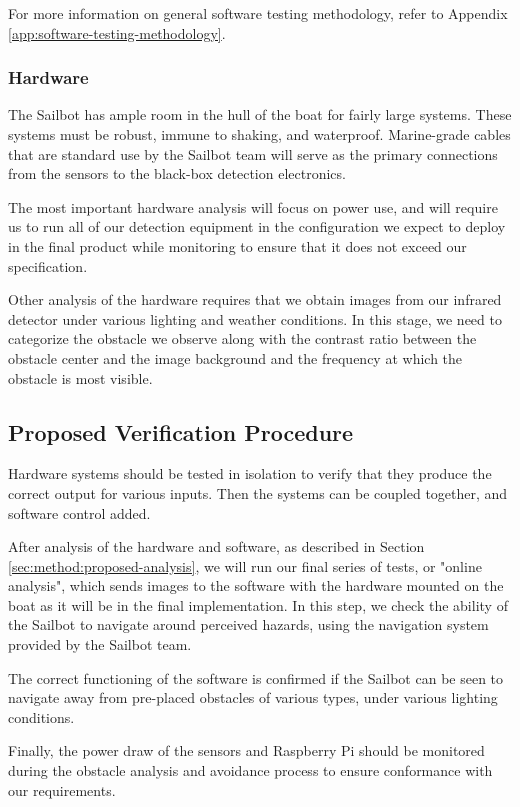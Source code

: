 For more information on general software testing methodology, refer to Appendix \ref{app:software-testing-methodology}.

\subsubsection{\label{sec:method:proposed-analysis:hardware}Hardware}
The Sailbot has ample room in the hull of the boat for fairly large systems. These systems must be robust, immune to shaking, and waterproof. Marine-grade cables that are standard use by the Sailbot team will serve as the primary connections from the sensors to the black-box detection electronics.

The most important hardware analysis will focus on power use, and will require us to run all of our detection equipment in the configuration we expect to deploy in the final product while monitoring to ensure that it does not exceed our specification.

Other analysis of the hardware requires that we obtain images from our infrared detector under various lighting and weather conditions. In this stage, we need to categorize the obstacle we observe along with the contrast ratio between the obstacle center and the image background and the frequency at which the obstacle is most visible.

\subsection{\label{sec:method:proposed-verification-procedure}Proposed Verification Procedure}

Hardware systems should be tested in isolation to verify that they produce the correct output for various inputs. Then the systems can be coupled together, and software control added.

After analysis of the hardware and software, as described in Section \ref{sec:method:proposed-analysis}, we will run our final series of tests, or "online analysis", which sends images to the software with the hardware mounted on the boat as it will be in the final implementation. In this step, we check the ability of the Sailbot to navigate around perceived hazards, using the navigation system provided by the Sailbot team.

The correct functioning of the software is confirmed if the Sailbot can be seen to navigate away from pre-placed obstacles of various types, under various lighting conditions.

Finally, the power draw of the sensors and Raspberry Pi should be monitored during the obstacle analysis and avoidance process to ensure conformance with our requirements.
